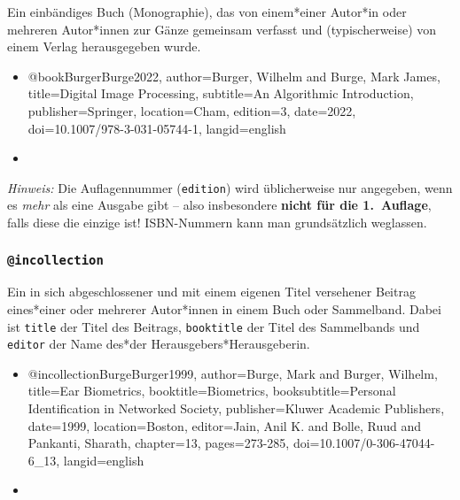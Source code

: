 Ein einbändiges Buch (Monographie), das von einem*einer Autor*in oder
mehreren Autor*innen zur Gänze gemeinsam verfasst und (typischerweise) von
einem Verlag herausgegeben wurde.
% 
\begin{itemize}
\item[]
\begin{GenericCode}[numbers=none]
@book{BurgerBurge2022,
	author={Burger, Wilhelm and Burge, Mark James},
	title={Digital Image Processing},
	subtitle={An Algorithmic Introduction},
	publisher={Springer},
	location={Cham},
	edition={3},
	date={2022},
	doi={10.1007/978-3-031-05744-1},
	langid={english}
}
\end{GenericCode}
\item[\cite{BurgerBurge2022}] 
\end{itemize}
%
\emph{Hinweis:} Die Auflagennummer (\texttt{edition}) wird üblicherweise nur
angegeben, wenn es \emph{mehr} als eine Ausgabe gibt -- also insbesondere
\textbf{nicht für die 1.\ Auflage}, falls diese die einzige ist! ISBN-Nummern
kann man grundsätzlich weglassen.


\subsubsection{\texttt{\bfseries @incollection}}
\label{sec:@incollection}

Ein in sich abgeschlossener und mit einem eigenen Titel versehener Beitrag
eines*einer oder mehrerer Autor*innen in einem Buch oder Sammelband. Dabei
ist \texttt{title} der Titel des Beitrags, \texttt{booktitle} der Titel des
Sammelbands und \texttt{editor} der Name des*der Herausgebers*Herausgeberin.
%
\begin{itemize}
\item[]
\begin{GenericCode}[numbers=none]
@incollection{BurgeBurger1999,
  author={Burge, Mark and Burger, Wilhelm},
  title={Ear Biometrics},
  booktitle={Biometrics},
  booksubtitle={Personal Identification in Networked Society},
  publisher={Kluwer Academic Publishers},
  date={1999},
  location={Boston},
  editor={Jain, Anil K. and Bolle, Ruud and Pankanti, Sharath},
  chapter={13},
  pages={273-285},
  doi={10.1007/0-306-47044-6_13},
  langid={english}
}
\end{GenericCode}
\item[\cite{BurgeBurger1999}] 
\end{itemize}


